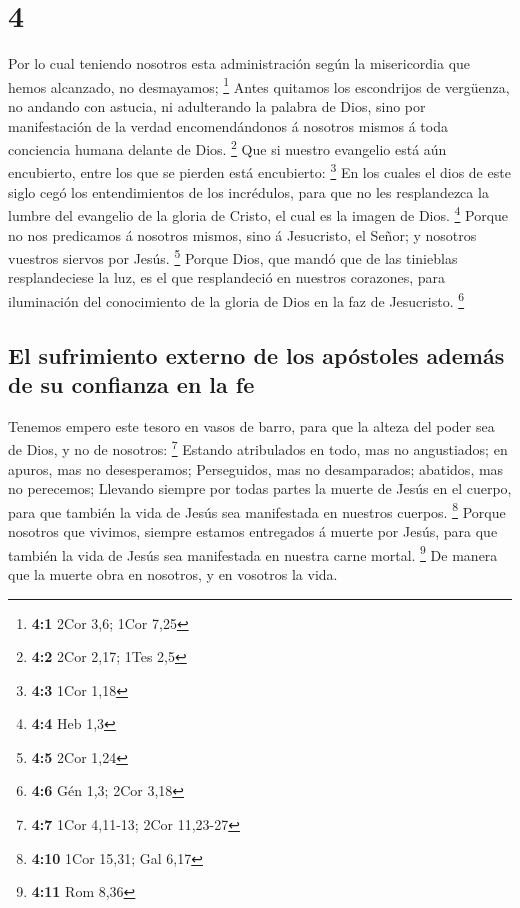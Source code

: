 \hypertarget{section-3}{%
\section{4}\label{section-3}}

 Por lo cual teniendo nosotros esta administración según la
misericordia que hemos alcanzado, no desmayamos; \footnote{\textbf{4:1}
  2Cor 3,6; 1Cor 7,25}  Antes quitamos los escondrijos de
vergüenza, no andando con astucia, ni adulterando la palabra de Dios,
sino por manifestación de la verdad encomendándonos á nosotros mismos á
toda conciencia humana delante de Dios. \footnote{\textbf{4:2} 2Cor
  2,17; 1Tes 2,5}  Que si nuestro evangelio está aún
encubierto, entre los que se pierden está encubierto: \footnote{\textbf{4:3}
  1Cor 1,18}  En los cuales el dios de este siglo cegó los
entendimientos de los incrédulos, para que no les resplandezca la lumbre
del evangelio de la gloria de Cristo, el cual es la imagen de Dios.
\footnote{\textbf{4:4} Heb 1,3}  Porque no nos predicamos á
nosotros mismos, sino á Jesucristo, el Señor; y nosotros vuestros
siervos por Jesús. \footnote{\textbf{4:5} 2Cor 1,24}  Porque
Dios, que mandó que de las tinieblas resplandeciese la luz, es el que
resplandeció en nuestros corazones, para iluminación del conocimiento de
la gloria de Dios en la faz de Jesucristo. \footnote{\textbf{4:6} Gén
  1,3; 2Cor 3,18}

\hypertarget{el-sufrimiento-externo-de-los-apuxf3stoles-ademuxe1s-de-su-confianza-en-la-fe}{%
\subsection{El sufrimiento externo de los apóstoles además de su
confianza en la
fe}\label{el-sufrimiento-externo-de-los-apuxf3stoles-ademuxe1s-de-su-confianza-en-la-fe}}

 Tenemos empero este tesoro en vasos de barro, para que la
alteza del poder sea de Dios, y no de nosotros: \footnote{\textbf{4:7}
  1Cor 4,11-13; 2Cor 11,23-27}  Estando atribulados en todo,
mas no angustiados; en apuros, mas no desesperamos; 
Perseguidos, mas no desamparados; abatidos, mas no perecemos;
 Llevando siempre por todas partes la muerte de Jesús en el
cuerpo, para que también la vida de Jesús sea manifestada en nuestros
cuerpos. \footnote{\textbf{4:10} 1Cor 15,31; Gal 6,17} 
Porque nosotros que vivimos, siempre estamos entregados á muerte por
Jesús, para que también la vida de Jesús sea manifestada en nuestra
carne mortal. \footnote{\textbf{4:11} Rom 8,36}  De manera
que la muerte obra en nosotros, y en vosotros la vida.

